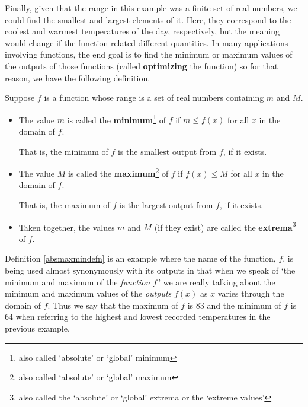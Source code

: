 Finally, given that the range in this example was a finite set of real numbers, we could find the smallest and largest elements of it.  Here, they correspond to the coolest and warmest temperatures of the day, respectively, but the meaning would change if the function related different quantities.  In many applications involving functions, the end goal is to find the minimum or maximum values of the outputs of those functions (called \textbf{optimizing} the function) so for that reason, we have the following definition.  

\begin{tcolorbox}

\begin{defn}

\label{absmaxmindefn}

Suppose $f$ is a function whose range is a set of real numbers containing $m$ and $M$.

\begin{itemize}

\item  The value $m$ is called the \textbf{minimum}\footnote{also called `absolute' or `global' minimum} of $f$ if $m \leq f(x)$ for all $x$ in the domain of $f$. 

That is, the minimum of $f$ is the smallest output from $f$, if it exists.

\item  The value $M$ is called the \textbf{maximum}\footnote{also called `absolute' or `global' maximum}  of $f$ if $f(x) \leq M$ for all $x$ in the domain of $f$. 

That is, the maximum of $f$ is the largest output from $f$, if it exists.

\item  Taken together, the values $m$ and $M$ (if they exist) are called the \textbf{extrema}\footnote{also called the `absolute' or `global' extrema or the `extreme values'} of $f$.

\end{itemize}

\end{defn}

\end{tcolorbox}

Definition \ref{absmaxmindefn} is an example where the name of the function, $f$, is being used almost synonymously with its outputs in that when we speak of `the minimum and maximum of the \textit{function} $f\,$' we are really talking about the minimum and maximum values of the \textit{outputs} $f(x)$ as $x$ varies through the domain of $f$.  Thus we say that the  maximum of $f$ is $83$ and the  minimum of $f$ is $64$ when referring to the highest and lowest recorded temperatures in the previous example.  

